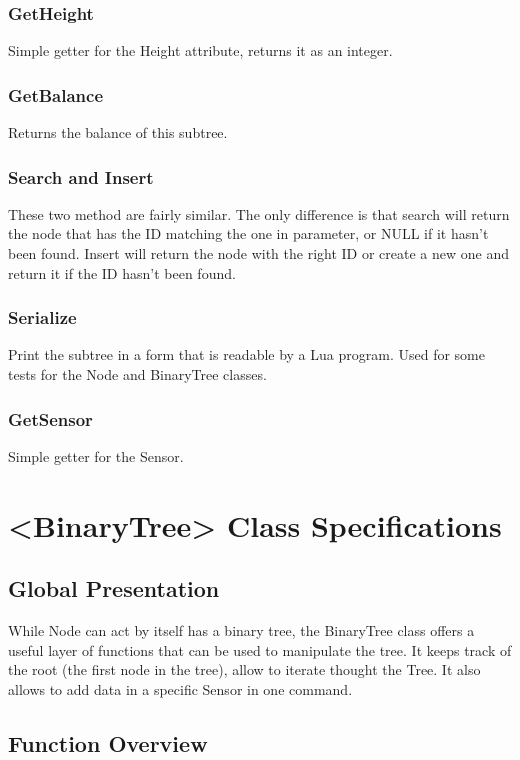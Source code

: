 \documentclass[10pt]{article}
\begin{document}
\subsubsection*{GetHeight}
Simple getter for the Height attribute, returns it as an integer.

\subsubsection*{GetBalance}
Returns the balance of this subtree.

\subsubsection*{Search and Insert}
These two method are fairly similar. The only difference is that search will return the node that has the ID matching the one in parameter, or NULL if it hasn't been found. Insert will return the node with the right ID or create a new one and return it if the ID hasn't been found.

\subsubsection*{Serialize}
Print the subtree in a form that is readable by a Lua program. Used for some tests for the Node and BinaryTree classes.

\subsubsection*{GetSensor}
Simple getter for the Sensor.

\section{<BinaryTree> Class Specifications}
\subsection{Global Presentation}
While Node can act by itself has a binary tree, the BinaryTree class offers a useful layer of functions that can be used to manipulate the tree. It keeps track of the root (the first node in the tree), allow to iterate thought the Tree. It also allows to add data in a specific Sensor in one command.

\subsection{Function Overview}
\end{document}
